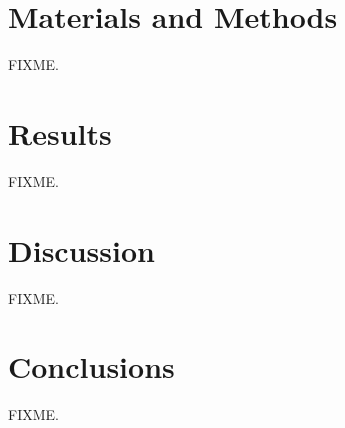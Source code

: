 \section{Materials and Methods}

\begin{doublespace}
FIXME.
\end{doublespace}

\section{Results}

\begin{doublespace}
FIXME.
\end{doublespace}

\section{Discussion}

\begin{doublespace}
FIXME.
\end{doublespace}

\section{Conclusions}

\begin{doublespace}
FIXME.
\end{doublespace}




